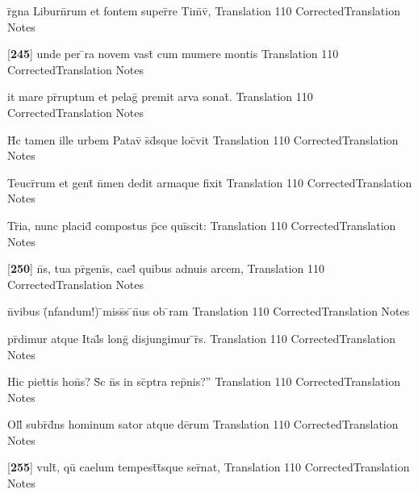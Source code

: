 \documentclass[]{book}
\begin{document}
\latline
  {r\={}gna Liburn\={}rum et fontem super\={}re Tim\={}v\={\macron {\i}},}
  { Translation }
  {110}
  { CorrectedTranslation }
  { Notes }


\latline
  {[\textbf{245}] unde per \={}ra novem vast\={} cum mumere montis}
  { Translation }
  {110}
  { CorrectedTranslation }
  { Notes }


\latline
  {it mare pr\={}ruptum et pelag\={} premit arva sonat\={\macron {\i}}.}
  { Translation }
  {110}
  { CorrectedTranslation }
  { Notes }


\latline
  {H\={\macron {\i}}c tamen ille urbem Patav\={\macron {\i}} s\={}d\={}sque loc\={}vit}
  { Translation }
  {110}
  { CorrectedTranslation }
  { Notes }


\latline
  {Teucr\={}rum et gent\={\macron {\i}} n\={}men dedit armaque fixit}
  { Translation }
  {110}
  { CorrectedTranslation }
  { Notes }


\latline
  {Tr\={}ia, nunc placid\={} compostus p\={}ce qui\={}scit:}
  { Translation }
  {110}
  { CorrectedTranslation }
  { Notes }


\latline
  {[\textbf{250}] n\={}s, tua pr\={}geni\={}s, cael\={\macron {\i}} quibus adnuis arcem,}
  { Translation }
  {110}
  { CorrectedTranslation }
  { Notes }


\latline
  {n\={}vibus (\={\macron {\i}}nfandum!) \={}miss\={\macron {\i}}s \={}n\={\macron {\i}}us ob \={\macron {\i}}ram}
  { Translation }
  {110}
  { CorrectedTranslation }
  { Notes }


\latline
  {pr\={}dimur atque Ital\={\macron {\i}}s long\={} disjungimur \={}r\={\macron {\i}}s.}
  { Translation }
  {110}
  { CorrectedTranslation }
  { Notes }


\latline
  {Hic piet\={}tis hon\={}s?  S\={\macron {\i}}c n\={}s in sc\={}ptra rep\={}nis?''}
  { Translation }
  {110}
  { CorrectedTranslation }
  { Notes }


\latline
  {Oll\={\macron {\i}} subr\={\macron {\i}}d\={}ns hominum sator atque de\={}rum}
  { Translation }
  {110}
  { CorrectedTranslation }
  { Notes }


\latline
  {[\textbf{255}] vult\={}, qu\={} caelum tempest\={}t\={}sque ser\={}nat,}
  { Translation }
  {110}
  { CorrectedTranslation }
  { Notes }
\end{document}
